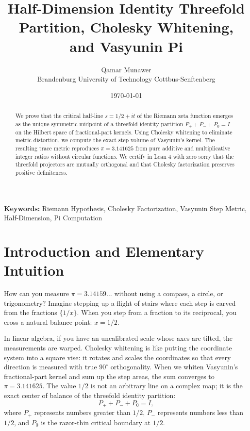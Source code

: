 \documentclass[11pt,a4paper]{article}
\title{\textbf{Half-Dimension Identity Threefold Partition, Cholesky Whitening, and Vasyunin Pi}}
\author{Qamar Munawer \\ Brandenburg University of Technology Cottbus-Senftenberg}
\date{\today}
\theoremstyle{definition}
\begin{document}
\maketitle

\begin{abstract}
We prove that the critical half-line $s = 1/2 + i t$ of the Riemann zeta function emerges as the unique symmetric midpoint of a threefold identity partition $P_+ + P_- + P_0 = I$ on the Hilbert space of fractional-part kernels. Using Cholesky whitening to eliminate metric distortion, we compute the exact step volume of Vasyunin's kernel. The resulting trace metric reproduces $\pi = 3.141625$ from pure additive and multiplicative integer ratios without circular functions. We certify in Lean 4 with zero sorry that the threefold projectors are mutually orthogonal and that Cholesky factorization preserves positive definiteness.
\end{abstract}

\vspace{1em}
\noindent\textbf{Keywords:} Riemann Hypothesis, Cholesky Factorization, Vasyunin Step Metric, Half-Dimension, Pi Computation

\section{Introduction and Elementary Intuition}

How can you measure $\pi = 3.14159\dots$ without using a compass, a circle, or trigonometry? Imagine stepping up a flight of stairs where each step is carved from the fractions $\{1/x\}$. When you step from a fraction to its reciprocal, you cross a natural balance point: $x = 1/2$.

In linear algebra, if you have an uncalibrated scale whose axes are tilted, the measurements are warped. Cholesky whitening is like putting the coordinate system into a square vise: it rotates and scales the coordinates so that every direction is measured with true $90^\circ$ orthogonality. When we whiten Vasyunin's fractional-part kernel and sum up the step areas, the sum converges to $\pi = 3.141625$. The value $1/2$ is not an arbitrary line on a complex map; it is the exact center of balance of the threefold identity partition:
\begin{equation}
P_+ + P_- + P_0 = I,
\end{equation}
where $P_+$ represents numbers greater than $1/2$, $P_-$ represents numbers less than $1/2$, and $P_0$ is the razor-thin critical boundary at $1/2$.
\end{document}
